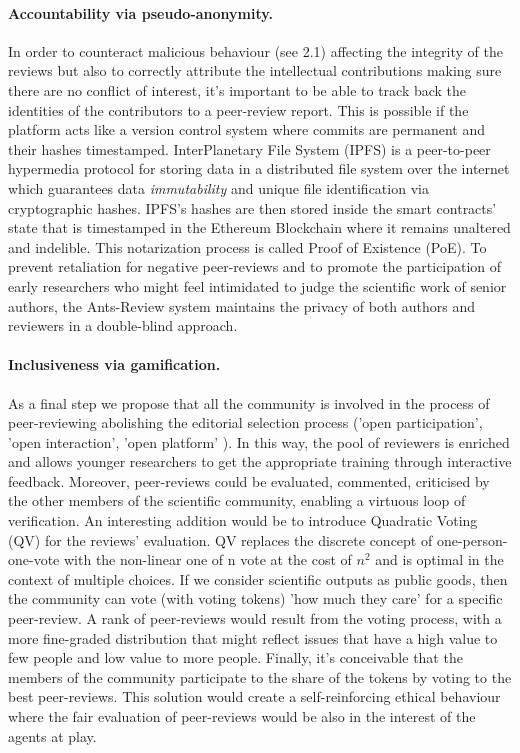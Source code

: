 \documentclass[runningheads]{llncs}
\begin{document}
\paragraph{Accountability via pseudo-anonymity.} In order to counteract malicious behaviour (see 2.1) affecting the integrity of the reviews but also to correctly attribute the intellectual contributions making sure there are no conflict of interest, it's important to be able to track back the identities of the contributors to a peer-review report. This is possible if the platform acts like a version control system where commits are permanent and their hashes timestamped. InterPlanetary File System (IPFS) \cite{IPFS} is a peer-to-peer hypermedia protocol for storing data in a distributed file system over the internet which guarantees data \emph{immutability} and unique file identification via cryptographic hashes. IPFS's hashes are then stored inside the smart contracts' state that is timestamped in the Ethereum Blockchain where it remains unaltered and indelible. This notarization process is called Proof of Existence (PoE).
\newline To prevent retaliation for negative peer-reviews and to promote the participation of early researchers who might feel intimidated to judge the scientific work of senior authors, the Ants-Review system maintains the privacy of both authors and reviewers in a double-blind approach.

\paragraph{Inclusiveness via gamification.} As a final step we propose that all the community is involved in the process of peer-reviewing abolishing the editorial selection process ('open participation', 'open interaction', 'open platform' \cite{OPR-Ross-Hellauer}). In this way, the pool of reviewers is enriched and allows younger researchers to get the appropriate training through interactive feedback. Moreover, peer-reviews could be evaluated, commented, criticised by the other members of the scientific community, enabling a virtuous loop of verification. \newline An interesting addition would be to introduce Quadratic Voting (QV) \cite{QVWeyl} for the reviews' evaluation. QV replaces the discrete concept of one-person-one-vote with the non-linear one of n vote at the cost of $n^2$ and is optimal in the context of multiple choices. If we consider scientific outputs as public goods, then the community can vote (with voting tokens) 'how much they care' for a specific peer-review. A rank of peer-reviews would result from the voting process, with a more fine-graded distribution that might reflect issues that have a high value to few people and low value to more people. \newline Finally, it's conceivable that the members of the community participate to the share of the tokens by voting to the best peer-reviews. This solution would create a self-reinforcing ethical behaviour where the fair evaluation of peer-reviews would be also in the interest of the agents at play.
\end{document}
